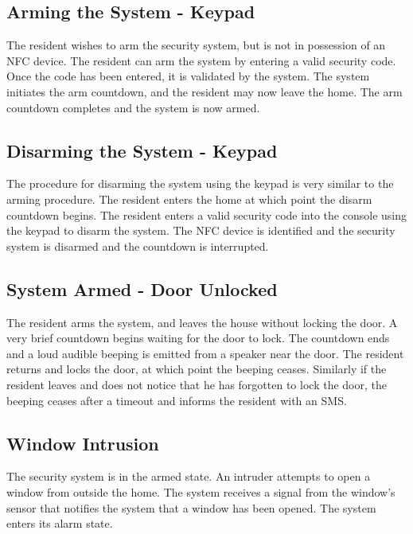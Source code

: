 \documentclass{report}
\begin{document}
\subsection*{Arming the System - Keypad}

The resident wishes to arm the security system, but is not in possession of an
NFC device.  The resident can arm the system by entering a valid security code.
Once the code has been entered, it is validated by the system. The system
initiates the arm countdown, and the resident may now leave the home. The arm
countdown completes and the system is now armed.

\subsection*{Disarming the System - Keypad}

The procedure for disarming the system using the keypad is very similar to the
arming procedure. The resident enters the home at which point the disarm
countdown begins. The resident enters a valid security code into the console
using the keypad to disarm the system.  The NFC device is identified and the
security system is disarmed and the countdown is interrupted.

\subsection*{System Armed - Door Unlocked}

The resident arms the system, and leaves the house without locking the door.
A very brief countdown begins waiting for the door to lock. The countdown
ends and a loud audible beeping is emitted from a speaker near the door. The
resident returns and locks the door, at which point the beeping ceases.
Similarly if the resident leaves and does not notice that he has forgotten to
lock the door, the beeping ceases after a timeout and informs the resident with
an SMS.

\subsection*{Window Intrusion}

The security system is in the armed state. An intruder attempts to open a
window from outside the home. The system receives a signal from the window's
sensor that notifies the system that a window has been opened. The system
enters its alarm state.
\end{document}
